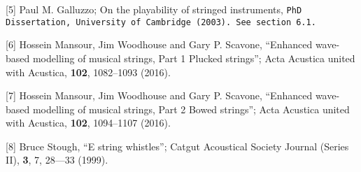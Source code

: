   [5] Paul M. Galluzzo; On the playability of stringed instruments, \tt{}PhD 
  Dissertation\rm{}, University of Cambridge (2003). See section 6.1. 

  [6] Hossein Mansour, Jim Woodhouse and Gary P. Scavone, ``Enhanced wave-based 
  modelling of musical strings, Part 1 Plucked strings''; Acta Acustica united 
  with Acustica, \textbf{102}, 1082--1093 (2016). 

  [7] Hossein Mansour, Jim Woodhouse and Gary P. Scavone, ``Enhanced wave-based 
  modelling of musical strings, Part 2 Bowed strings''; Acta Acustica united 
  with Acustica, \textbf{102}, 1094--1107 (2016). 

  [8] Bruce Stough, “E string whistles”; Catgut Acoustical Society Journal 
  (Series II), \textbf{3}, 7, 28—33 (1999). 